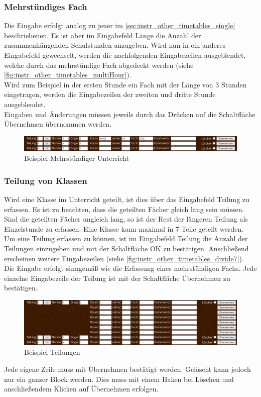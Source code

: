 \subsubsection{Mehrstündiges Fach}
Die Eingabe erfolgt analog zu jener im \autoref{sec:instr_other_timetables_single} beschriebenen. Es ist aber im Eingabefeld Länge die Anzahl der zusammenhängenden Schulstunden anzugeben. Wird nun in ein anderes Eingabefeld gewechselt, werden die nachfolgenden Eingabezeilen ausgeblendet, welche durch das mehrstündige Fach abgedeckt werden (siehe \autoref{fig:instr_other_timetables_multiHour}).\\
Wird zum Beispiel in der ersten Stunde ein Fach mit der Länge von 3 Stunden eingetragen, werden die Eingabezeilen der zweiten und dritte Stunde ausgeblendet.\\
Eingaben und Änderungen müssen jeweils durch das Drücken auf die Schaltfläche Übernehmen übernommen werden.
\begin{figure}[H]
\centering
\includegraphics[keepaspectratio=true, width=17cm]{images/screenshots/timetables_input_multiHour.png}
\caption{Beispiel Mehrstündiger Unterricht}
\label{fig:instr_other_timetables_multiHour}
\end{figure}
\subsubsection{Teilung von Klassen}
Wird eine Klasse im Unterricht geteilt, ist dies über das Eingabefeld Teilung zu erfassen. Es ist zu beachten, dass die geteilten Fächer gleich lang sein müssen. Sind die geteilten Fächer ungleich lang, so ist der Rest der längeren Teilung als Einzelstunde zu erfassen. Eine Klasse kann maximal in 7 Teile geteilt werden.\\
Um eine Teilung erfassen zu können, ist im Eingabefeld Teilung die Anzahl der Teilungen einzugeben und mit der Schaltfläche OK zu bestätigen. Anschließend erscheinen weitere Eingabezeilen (siehe \autoref{fig:instr_other_timetables_divide7}).\\
Die Eingabe erfolgt sinngemäß wie die Erfassung eines mehrstündigen Fachs. Jede einzelne Eingabezeile der Teilung ist mit der Schaltfläche Übernehmen zu bestätigen.
\begin{figure}[H]
\centering
\includegraphics[keepaspectratio=true, width=17cm]{images/screenshots/timetables_input_divide7.png}
\caption{Beispiel Teilungen}
\label{fig:instr_other_timetables_divide7}
\end{figure}
Jede eigene Zeile muss mit Übernehmen bestätigt werden. Gelöscht kann jedoch nur ein ganzer Block werden. Dies muss mit einem Haken bei Löschen und anschließendem Klicken auf Übernehmen erfolgen.
